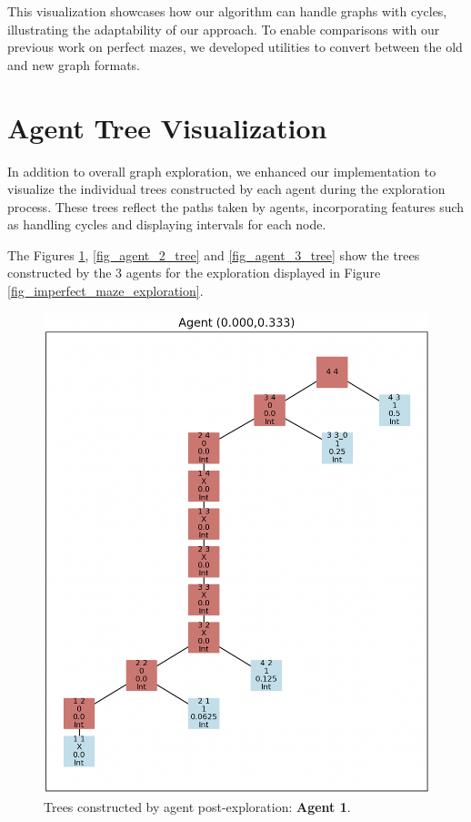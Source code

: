 This visualization showcases how our algorithm can handle graphs
with cycles, illustrating the adaptability of our approach.
To enable comparisons with our previous work on perfect mazes,
we developed utilities to convert between the old and new graph formats.

\section{Agent Tree Visualization}
\label{section_result_tree_visualization}

In addition to overall graph exploration,
we enhanced our implementation to visualize the individual trees constructed by each agent during the exploration process.
These trees reflect the paths taken by agents, incorporating features such as handling
cycles and displaying intervals for each node.

The Figures \ref{fig_agent_1_tree}, \ref{fig_agent_2_tree} and \ref{fig_agent_3_tree}
show the trees constructed by the 3 agents for the exploration displayed in Figure \ref{fig_imperfect_maze_exploration}.
    
\begin{figure}[H]
\centering
\includegraphics[width=1\textwidth]{Cap3/agent_1.png}
\caption{Trees constructed by agent post-exploration: \textbf{Agent 1}.}
\label{fig_agent_1_tree}
\end{figure}

